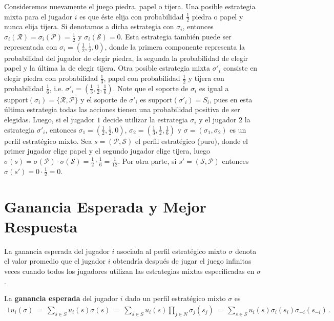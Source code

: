 Consideremos nuevamente el juego piedra, papel o tijera. Una posible estrategia mixta para el jugador $i$ es que éste elija con probabilidad $\frac{1}{2}$ piedra o papel y nunca elija tijera. Si denotamos a dicha estrategia con $\sigma_i$, entonces $\sigma_i(\mathcal{R}) = \sigma_i(\mathcal{P}) = \frac{1}{2}$ y $\sigma_i(\mathcal{S}) = 0$. Esta estrategia también puede ser representada con $\sigma_i = (\frac{1}{2}, \frac{1}{2}, 0)$, donde la primera componente representa la probabilidad del jugador de elegir piedra, la segunda la probabilidad de elegir papel y la última la de elegir tijera. Otra posible estrategia mixta $\sigma'_i$ consiste en elegir piedra con probabilidad $\frac{1}{3}$, papel con probabilidad $\frac{1}{2}$ y tijera con probabilidad $\frac{1}{6}$, i.e. $\sigma'_i = \left(\frac{1}{3}, \frac{1}{2}, \frac{1}{6} \right)$. Note que el soporte de $\sigma_i$ es igual a $\text{support}(\sigma_i) = \{\mathcal{R}, \mathcal{P} \}$ y el soporte de $\sigma'_{i}$ es $\text{support}(\sigma'_i) = S_i$, pues en esta última estrategia todas las acciones tienen una probabilidad positiva de ser elegidas. Luego, si el jugador $1$ decide utilizar la estrategia $\sigma_i$ y el jugador $2$ la estrategia $\sigma'_i$, entonces $\sigma_1 = \left( \frac{1}{2}, \frac{1}{2}, 0 \right)$, $\sigma_2 = \left(\frac{1}{3}, \frac{1}{2}, \frac{1}{6}\right)$ y $\sigma = (\sigma_1, \sigma_2)$ es un perfil estratégico mixto. Sea $s = (\mathcal{P}, \mathcal{S})$ el perfil estratégico (puro), donde el primer jugador elige papel y el segundo jugador elige tijera, luego $\sigma(s) = \sigma(\mathcal{P}) \cdot \sigma(\mathcal{S}) = \frac{1}{2} \cdot \frac{1}{6} = \frac{1}{12}$. Por otra parte, si $s' = (\mathcal{S}, \mathcal{P})$ entonces $\sigma(s') = 0 \cdot \frac{1}{2} = 0$.

\section{Ganancia Esperada y Mejor Respuesta}
La ganancia esperada del jugador $i$ asociada al perfil estratégico mixto $\sigma$ denota el valor promedio que el jugador $i$ obtendría después de jugar el juego infinitas veces cuando todos los jugadores utilizan las estrategias mixtas especificadas en $\sigma$. 

\begin{definition}
\label{def:ganancia-esperada}
La \textbf{ganancia esperada} del jugador $i$ dado un perfil estratégico mixto $\sigma$ es
\begin{alignat}{1}
	u_i(\sigma)\ =\ \sum_{s \in S} u_i(s) \sigma(s)\ =\ \sum_{s \in S} u_i(s) \prod _{j \in N} \sigma_j(s_j)\ =\ \sum_{s \in S} u_i(s) \sigma_i(s_i) \sigma_{-i}(s_{-i})\,.
\end{alignat}
\end{definition}

